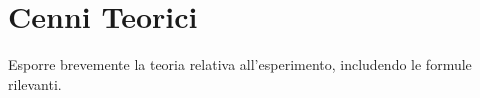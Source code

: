 \section{Cenni Teorici}
Esporre brevemente la teoria relativa all'esperimento, includendo le formule rilevanti.

